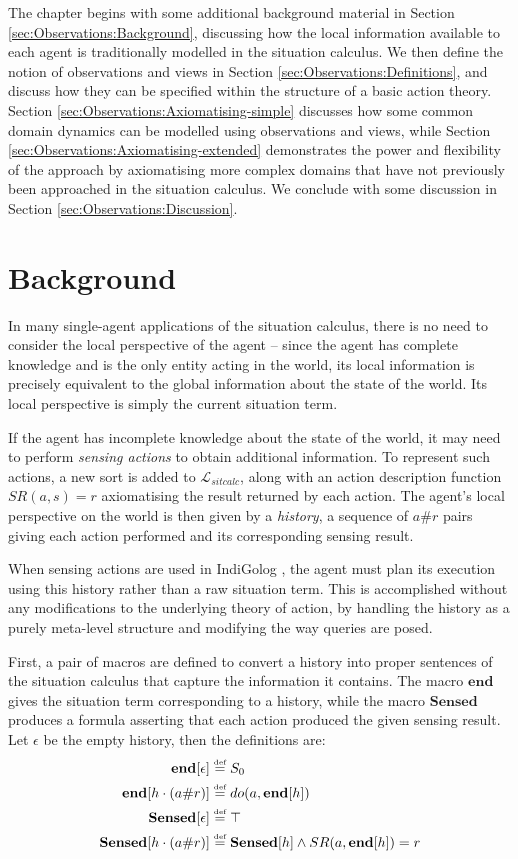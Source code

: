 The chapter begins with some additional background material in Section
\ref{sec:Observations:Background}, discussing how the local information
available to each agent is traditionally modelled in the situation
calculus. We then define the notion of observations and views in Section
\ref{sec:Observations:Definitions}, and discuss how they can be specified
within the structure of a basic action theory. Section \ref{sec:Observations:Axiomatising-simple}
discusses how some common domain dynamics can be modelled using observations
and views, while Section \ref{sec:Observations:Axiomatising-extended}
demonstrates the power and flexibility of the approach by axiomatising
more complex domains that have not previously been approached in the
situation calculus. We conclude with some discussion in Section \ref{sec:Observations:Discussion}.


\section{Background\label{sec:Observations:Background}}

In many single-agent applications of the situation calculus, there
is no need to consider the local perspective of the agent -- since
the agent has complete knowledge and is the only entity acting in
the world, its local information is precisely equivalent to the global
information about the state of the world. Its local perspective is
simply the current situation term.

If the agent has incomplete knowledge about the state of the world,
it may need to perform \emph{sensing actions} to obtain additional
information. To represent such actions, a new sort is
added to $\mathcal{L}_{sitcalc}$, along with an action description
function $SR(a,s)=r$ axiomatising the result returned by each action.
The agent's local perspective on the world is then given by a \emph{history},
a sequence of $a\#r$ pairs giving each action performed and its corresponding
sensing result.

When sensing actions are used in IndiGolog \citep{giacomo99indigolog},
the agent must plan its execution using this history rather than a
raw situation term. This is accomplished without any modifications
to the underlying theory of action, by handling the history as a purely
meta-level structure and modifying the way queries are posed.

First, a pair of macros are defined to convert a history into proper
sentences of the situation calculus that capture the information it
contains. The macro $\mathbf{end}$ gives the situation term corresponding
to a history, while the macro $\mathbf{Sensed}$ produces a formula
asserting that each action produced the given sensing result. Let
$\epsilon$ be the empty history, then the definitions are:\begin{alignat*}{1}
\mathbf{end}[\epsilon] & \stackrel{\mbox{\tiny def}}{=} S_{0}\\
\mathbf{end}[h\cdot(a\#r)] & \stackrel{\mbox{\tiny def}}{=} do(a,\mathbf{end}[h])\\
\mathbf{Sensed}[\epsilon] & \stackrel{\mbox{\tiny def}}{=}\top\\
\mathbf{Sensed}[h\cdot(a\#r)] & \stackrel{\mbox{\tiny def}}{=}\mathbf{Sensed}[h]\wedge SR(a,\mathbf{end}[h])=r\end{alignat*}


